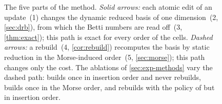 \begin{figure}[t]
  \centering
  
  \caption{The five parts of the method. \emph{Solid arrows:} each atomic edit
    of an update~(1) changes the dynamic reduced basis of one dimension~(2,
    \cref{sec:drb}), from which the Betti numbers are read off~(3,
    \cref{thm:exact}); this path is exact for every order of the cells.
    \emph{Dashed arrows:} a rebuild~(4, \cref{cor:rebuild}) recomputes the
    basis by static reduction in the Morse-induced order~(5, \cref{sec:morse});
    this path changes only the cost. The ablations of \cref{sec:exp-methods} vary the dashed path:
     builds once in insertion order and never rebuilds,
     builds once in the Morse order, and 
    rebuilds with the policy of  but in insertion order.}
  \label{fig:method}
\end{figure}

